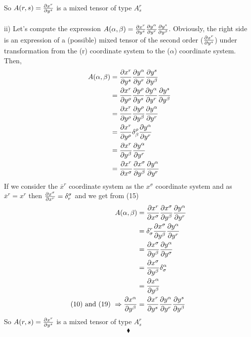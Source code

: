 So $A(r,s) = \pdv{x^r}{y^s}$ is a mixed tensor of type $A_s^r$\\\\
ii) Let's compute the expression $A(\alpha, \beta) = \pdv{x^r}{y^s}\pdv{y^{\alpha}}{y^r}\pdv{y^s}{y^{\beta }}$. Obviously, the right side is an expression of a (possible) mixed tensor of the second order ($\pdv{x^r}{y^s}$) under transformation from the (r) coordinate system to the ($\alpha$) coordinate system. Then, 
\begin{align}
\ A(\alpha, \beta) &= \pdv{x^r}{y^s}\pdv{y^{\alpha}}{y^r}\pdv{y^s}{y^{\beta }}\\
&= \pdv{x^r}{y^{\rho}}\pdv{y^{\rho}}{y^s}\pdv{y^{\alpha}}{y^r}\pdv{y^s}{y^{\beta }}\\
&= \pdv{x^r}{y^{\rho}}\pdv{y^{\rho}}{y^{\beta}}\pdv{y^{\alpha}}{y^r}\\
&= \pdv{x^r}{y^{\rho}}\delta^{\rho}_{\beta}\pdv{y^{\alpha}}{y^r}\\
&= \pdv{x^r}{y^{\beta}}\pdv{y^{\alpha}}{y^r}\\
&= \pdv{x^r}{x^{\sigma}}\pdv{x^{\sigma}}{y^{\beta}}\pdv{y^{\alpha}}{y^r}
\end{align}
If we consider the $\overline{x}^r$ coordinate system as the $x^{\sigma }$ coordinate system and as $\overline{x}^r = x^r$ then $\pdv{x^{\sigma }}{x^r} = \delta^{\sigma}_r$ and we get from (15)
\begin{align}
\ A(\alpha, \beta) &= \pdv{x^r}{x^{\sigma}}\pdv{x^{\sigma}}{y^{\beta}}\pdv{y^{\alpha}}{y^r}\\
\ &= \delta^r_{\sigma}\pdv{x^{\sigma}}{y^{\beta}}\pdv{y^{\alpha}}{y^r}\\
\ &= \pdv{x^{\sigma}}{y^{\beta}}\pdv{y^{\alpha}}{y^{\sigma}}\\
\ &= \pdv{x^{\sigma}}{y^{\beta}}\delta^{\alpha}_{\sigma}\\
\ &= \pdv{x^{\alpha}}{y^{\beta}}\\
\text{(10) and (19)   } \Rightarrow \pdv{x^{\alpha}}{y^{\beta}} &= \pdv{x^r}{y^s}\pdv{y^{\alpha}}{y^r}\pdv{y^s}{y^{\beta }}
\end{align}
So $A(r,s) = \pdv{x^r}{y^s}$ is a mixed tensor of type $A_s^r$
$$\blacklozenge$$
\pagebreak[4]

